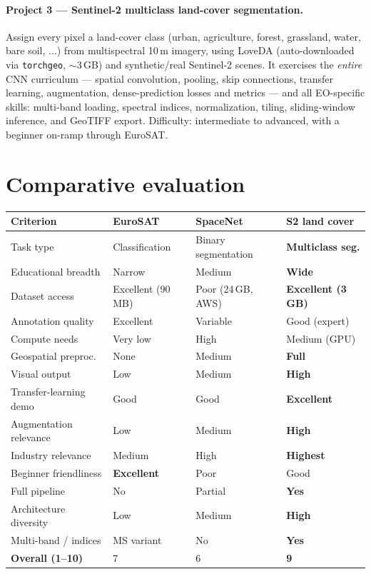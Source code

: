\documentclass[11pt,openany]{book}
\theoremstyle{definition}
\begin{document}
\paragraph{Project 3 --- Sentinel-2 multiclass land-cover segmentation.}
Assign every pixel a land-cover class (urban, agriculture, forest, grassland,
water, bare soil, $\dots$) from multispectral 10\,m imagery, using LoveDA
(auto-downloaded via \texttt{torchgeo}, $\sim$3\,GB) and synthetic/real
Sentinel-2 scenes. It exercises the \emph{entire} CNN curriculum --- spatial
convolution, pooling, skip connections, transfer learning, augmentation,
dense-prediction losses and metrics --- and all EO-specific skills: multi-band
loading, spectral indices, normalization, tiling, sliding-window inference, and
GeoTIFF export. Difficulty: intermediate to advanced, with a beginner on-ramp
through EuroSAT.

\section*{Comparative evaluation}

\begin{center}\small
\renewcommand{\arraystretch}{1.25}
\begin{tabularx}{\linewidth}{@{}lXXX@{}}
\toprule
\textbf{Criterion} & \textbf{EuroSAT} & \textbf{SpaceNet} & \textbf{S2 land cover}\\
\midrule
Task type & Classification & Binary segmentation & \textbf{Multiclass seg.}\\
Educational breadth & Narrow & Medium & \textbf{Wide}\\
Dataset access & Excellent (90\,MB) & Poor (24\,GB, AWS) & \textbf{Excellent (3\,GB)}\\
Annotation quality & Excellent & Variable & Good (expert)\\
Compute needs & Very low & High & Medium (GPU)\\
Geospatial preproc. & None & Medium & \textbf{Full}\\
Visual output & Low & Medium & \textbf{High}\\
Transfer-learning demo & Good & Good & \textbf{Excellent}\\
Augmentation relevance & Low & Medium & \textbf{High}\\
Industry relevance & Medium & High & \textbf{Highest}\\
Beginner friendliness & \textbf{Excellent} & Poor & Good\\
Full pipeline & No & Partial & \textbf{Yes}\\
Architecture diversity & Low & Medium & \textbf{High}\\
Multi-band / indices & MS variant & No & \textbf{Yes}\\
\midrule
\textbf{Overall (1--10)} & 7 & 6 & \textbf{9}\\
\bottomrule
\end{tabularx}
\end{center}
\end{document}
